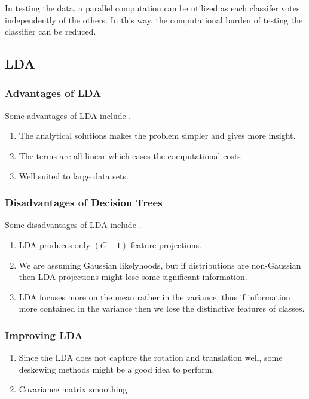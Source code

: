 In testing the data, a parallel computation can be utilized as each classifer votes independently of the others. In this way, the computational burden of testing the classifier can be reduced.

\subsection{LDA}
\subsubsection{Advantages of LDA}
Some advantages of LDA include \cite{book:advlda}.
%
\begin{enumerate}
	\item The analytical solutions makes the problem simpler and gives more insight.
	\item The terms are all linear which eases the computational costs
	\item Well suited to large data sets.
\end{enumerate}

\subsubsection{Disadvantages of Decision Trees}

Some disadvantages of LDA include \cite{notes:dislda}.
%
\begin{enumerate}
	\item LDA produces only $(C-1)$ feature projections. 
	\item We are assuming Gaussian likelyhoods, but if distributions are non-Gaussian then LDA projections might lose some significant information.
	\item LDA focuses more on the mean rather in the variance, thus if information more contained in the variance then we lose the distinctive features of classes.
\end{enumerate}

\subsubsection{Improving LDA}

\begin{enumerate}
	\item Since the LDA does not capture the rotation and translation well, some deskewing methods might be a good idea to perform.
	\item Covariance matrix smoothing 
	
\end{enumerate}	